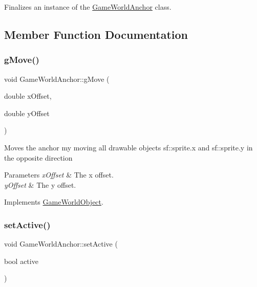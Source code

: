 Finalizes an instance of the \hyperlink{class_game_world_anchor}{Game\+World\+Anchor} class. 



\subsection{Member Function Documentation}
\mbox{\label{class_game_world_anchor_a35bafca13929710c6138950c7c38ec71}} 
\subsubsection{\texorpdfstring{g\+Move()}{gMove()}}
{\footnotesize\ttfamily void Game\+World\+Anchor\+::g\+Move (\begin{DoxyParamCaption}\item[{double}]{x\+Offset,  }\item[{double}]{y\+Offset }\end{DoxyParamCaption})\hspace{0.3cm}{\ttfamily [virtual]}}



\textquotesingle{}Moves\textquotesingle{} the anchor my moving all drawable objects sf\+::sprite.\+x and sf\+::sprite.\+y in the opposite direction 


\begin{DoxyParams}{Parameters}
{\em x\+Offset} & The x offset.\\
\hline
{\em y\+Offset} & The y offset.\\
\hline
\end{DoxyParams}


Implements \hyperlink{class_game_world_object_a3ddbcf57e6eb43cb4aaec7ac347d4e17}{Game\+World\+Object}.

\mbox{\label{class_game_world_anchor_accfec567c6edaa530ef6f5d5b5489d6b}} 
\subsubsection{\texorpdfstring{set\+Active()}{setActive()}}
{\footnotesize\ttfamily void Game\+World\+Anchor\+::set\+Active (\begin{DoxyParamCaption}\item[{bool}]{active }\end{DoxyParamCaption})\hspace{0.3cm}{\ttfamily [virtual]}}



